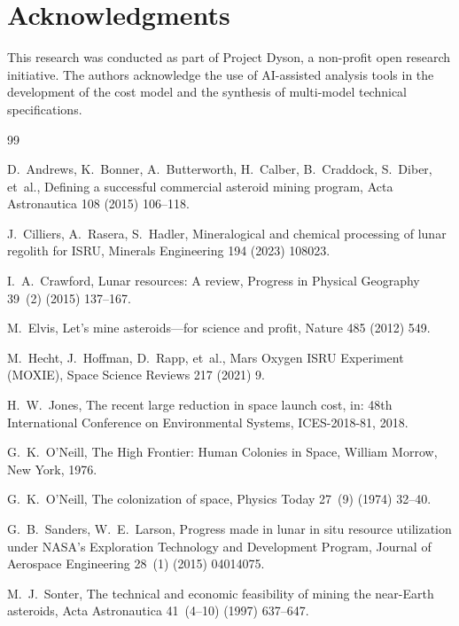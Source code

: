 \documentclass[preprint,12pt]{elsarticle}
\begin{document}
\section*{Acknowledgments}

This research was conducted as part of Project Dyson, a non-profit open research initiative. The authors acknowledge the use of AI-assisted analysis tools in the development of the cost model and the synthesis of multi-model technical specifications.

\begin{thebibliography}{99}

D.~Andrews, K.~Bonner, A.~Butterworth, H.~Calber, B.~Craddock, S.~Diber, et~al.,
\newblock Defining a successful commercial asteroid mining program,
\newblock Acta Astronautica 108 (2015) 106--118.

J.~Cilliers, A.~Rasera, S.~Hadler,
\newblock Mineralogical and chemical processing of lunar regolith for ISRU,
\newblock Minerals Engineering 194 (2023) 108023.

I.~A.~Crawford,
\newblock Lunar resources: A review,
\newblock Progress in Physical Geography 39~(2) (2015) 137--167.

M.~Elvis,
\newblock Let's mine asteroids---for science and profit,
\newblock Nature 485 (2012) 549.

M.~Hecht, J.~Hoffman, D.~Rapp, et~al.,
\newblock Mars Oxygen ISRU Experiment (MOXIE),
\newblock Space Science Reviews 217 (2021) 9.

H.~W.~Jones,
\newblock The recent large reduction in space launch cost,
\newblock in: 48th International Conference on Environmental Systems, ICES-2018-81, 2018.

G.~K.~O'Neill,
\newblock The High Frontier: Human Colonies in Space,
\newblock William Morrow, New York, 1976.

G.~K.~O'Neill,
\newblock The colonization of space,
\newblock Physics Today 27~(9) (1974) 32--40.

G.~B.~Sanders, W.~E.~Larson,
\newblock Progress made in lunar in situ resource utilization under NASA's Exploration Technology and Development Program,
\newblock Journal of Aerospace Engineering 28~(1) (2015) 04014075.

M.~J.~Sonter,
\newblock The technical and economic feasibility of mining the near-Earth asteroids,
\newblock Acta Astronautica 41~(4--10) (1997) 637--647.


\end{thebibliography}
\end{document}

